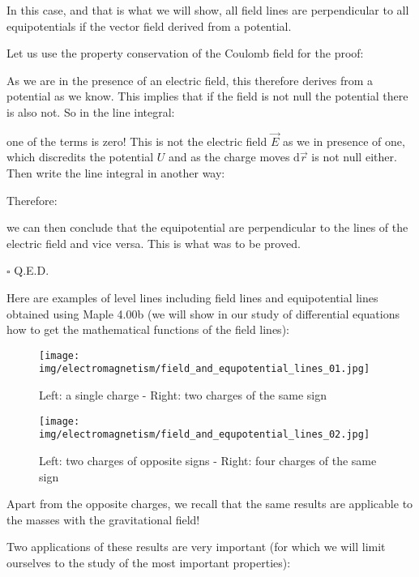 	\begin{theorem}
	In this case, and that is what we will show, all field lines are perpendicular to all equipotentials if the vector field derived from a potential.
	\end{theorem}
	Let us use the property conservation of the Coulomb field for the proof:
	\begin{dem}
	
	As we are in the presence of an electric field, this therefore derives from a potential as we know. This implies that if the field is not null the potential there is also not. So in the line integral:
	
	one of the terms is zero! This is not the electric field $\vec{E}$ as we in presence of one, which discredits the potential $U$ and as the charge moves $\mathrm{d}\vec{r}$ is not null either. Then write the line integral in another way:
	
	Therefore:
	
	we can then conclude that the equipotential are perpendicular to the lines of the electric field and vice versa. This is what was to be proved.
	\begin{flushright}
		$\square$  Q.E.D.
	\end{flushright}
	\end{dem}
	Here are examples of level lines including field lines and equipotential lines obtained using Maple 4.00b (we will show in our study of differential equations how to get the mathematical functions of the field lines):
	\begin{figure}[H]
		\centering
		\texttt{[image: img/electromagnetism/field\_and\_equpotential\_lines\_01.jpg]}
		\caption[]{Left: a single charge - Right: two charges of the same sign}
		\texttt{[image: img/electromagnetism/field\_and\_equpotential\_lines\_02.jpg]}
		\caption[]{Left: two charges of opposite signs - Right: four charges of the same sign}
	\end{figure}
	\begin{tcolorbox}[title=Remark,colframe=black,arc=10pt]
	Apart from the opposite charges, we recall that the same results are applicable to the masses with the gravitational field!
	\end{tcolorbox}
	Two applications of these results are very important (for which we will limit ourselves to the study of the most important properties):
